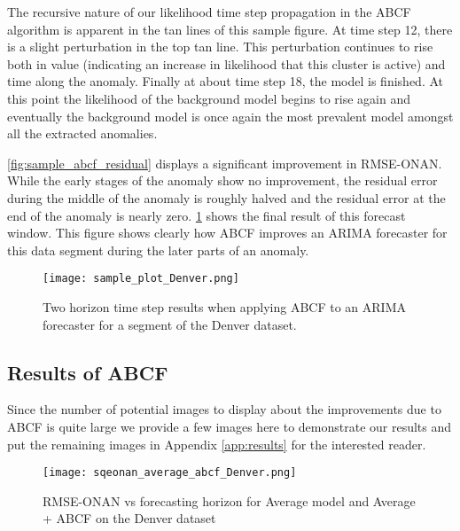 The recursive nature of our likelihood time step propagation in the ABCF algorithm is apparent in the tan lines of this sample figure.  At time step 12, there is a slight perturbation in the top tan line.  This perturbation continues to rise both in value (indicating an increase in likelihood that this cluster is active) and time along the anomaly.  Finally at about time step 18, the model is finished.  At this point the likelihood of the background model begins to rise again and eventually the background model is once again the most prevalent model amongst all the extracted anomalies.

\ref{fig:sample_abcf_residual} displays a significant improvement in RMSE-ONAN.  While the early stages of the anomaly show no improvement, the residual error during the middle of the anomaly is roughly halved and the residual error at the end of the anomaly is nearly zero.  \ref{fig:sample_abcf_denver} shows the final result of this forecast window.  This figure shows clearly how ABCF improves an ARIMA forecaster for this data segment during the later parts of an anomaly.

\begin{figure}[!h]
	\begin{center}
		\texttt{[image: sample\_plot\_Denver.png]}
	\end{center}
	\caption{Two horizon time step results when applying ABCF to an ARIMA forecaster for a segment of the Denver dataset.}
	\label{fig:sample_abcf_denver}
\end{figure}


\subsection{Results of ABCF}
Since the number of potential images to display about the improvements due to ABCF is quite large  we provide a few images here to demonstrate our results and put the remaining images in Appendix \ref{app:results} for the interested reader.

\begin{figure}[!b]
	\begin{center}
		\texttt{[image: sqeonan\_average\_abcf\_Denver.png]}
	\end{center}
	\caption{RMSE-ONAN vs forecasting horizon for Average model and Average + ABCF on the Denver dataset}
	\label{fig:average_abcf_denver}
\end{figure}


